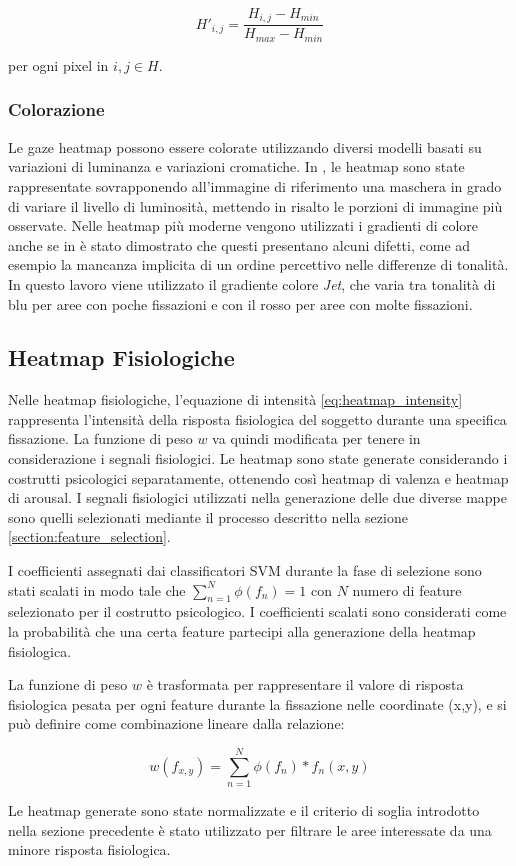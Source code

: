 \begin{equation}
  H'_{i,j} = \frac{H_{i,j}-{H_{min}}}{H_{max}-H_{min}}
  \label{eq:min_max_normalization}
\end{equation}

per ogni pixel in $i,j \in H$.

\subsubsection*{Colorazione}
Le gaze heatmap possono essere colorate utilizzando diversi modelli basati su variazioni di luminanza e variazioni cromatiche.
In \cite{pomplun1996disambiguating}, le heatmap sono state rappresentate sovrapponendo all'immagine di riferimento una maschera in grado di variare il livello di luminosità, mettendo in risalto le porzioni di immagine più osservate.
Nelle heatmap più moderne vengono utilizzati i gradienti di colore anche se in \cite{borland2007rainbow} è stato dimostrato che questi presentano alcuni difetti, come ad esempio la mancanza implicita di un ordine percettivo nelle differenze di tonalità.
In questo lavoro viene utilizzato il gradiente colore \textit{Jet}, che varia tra tonalità di blu per aree con poche fissazioni e con il rosso per aree con molte fissazioni.

\subsection{Heatmap Fisiologiche}

Nelle heatmap fisiologiche, l'equazione di intensità \ref{eq:heatmap_intensity} rappresenta l'intensità della risposta fisiologica del soggetto durante una specifica fissazione. La funzione di peso $w$ va quindi modificata per tenere in considerazione i segnali fisiologici. Le heatmap sono state generate considerando i costrutti psicologici separatamente, ottenendo così heatmap di valenza e heatmap di arousal. I segnali fisiologici utilizzati nella generazione delle due diverse mappe sono quelli selezionati mediante il processo descritto nella sezione \ref{section:feature_selection}.

I coefficienti assegnati dai classificatori SVM durante la fase di selezione sono stati scalati in modo tale che $\sum_{n=1}^{N} \phi(f_{n}) = 1$ con $N$ numero di feature selezionato per il costrutto psicologico. I coefficienti scalati sono considerati come la probabilità che una certa feature partecipi alla generazione della heatmap fisiologica.

La funzione di peso $w$ è trasformata per rappresentare il valore di risposta fisiologica pesata per ogni feature durante la fissazione nelle coordinate (x,y), e si può definire come combinazione lineare dalla relazione:

\begin{equation}
  w(f_{x,y}) = \sum_{n=1}^{N}\phi(f_{n})*f_{n}(x,y)
\end{equation}

Le heatmap generate sono state normalizzate e il criterio di soglia introdotto nella sezione precedente è stato utilizzato per filtrare le aree interessate da una minore risposta fisiologica.

